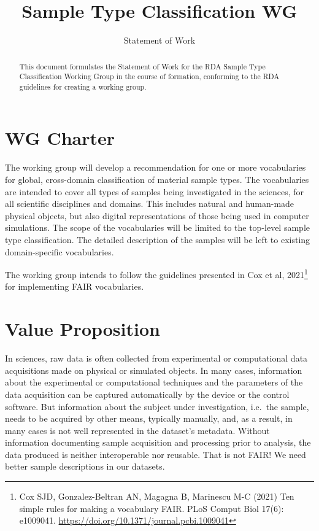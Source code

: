 \documentclass{scrartcl}
\begin{document}
\titlehead{\hfill\texttt{[image: rda-logo]}}
\title{Sample Type Classification WG}
\subtitle{Statement of Work}

\maketitle

\begin{abstract}\noindent
  This document formulates the Statement of Work for the RDA Sample
  Type Classification Working Group in the course of formation,
  conforming to the RDA guidelines for creating a working group.
\end{abstract}

\section{WG Charter}

The working group will develop a recommendation for one or more
vocabularies for global, cross-domain classification of material
sample types.  The vocabularies are intended to cover all types of
samples being investigated in the sciences, for all scientific
disciplines and domains.  This includes natural and human-made
physical objects, but also digital representations of those being used
in computer simulations.  The scope of the vocabularies will be
limited to the top-level sample type classification.  The detailed
description of the samples will be left to existing domain-specific
vocabularies.

The working group intends to follow the guidelines presented in Cox et
al, 2021\footnote{Cox SJD, Gonzalez-Beltran AN, Magagna B, Marinescu
  M-C (2021) Ten simple rules for making a vocabulary FAIR. PLoS
  Comput Biol 17(6): e1009041.
  \url{https://doi.org/10.1371/journal.pcbi.1009041}} for implementing
FAIR vocabularies.

\section{Value Proposition}

In sciences, raw data is often collected from experimental or
computational data acquisitions made on physical or simulated objects.
In many cases, information about the experimental or computational
techniques and the parameters of the data acquisition can be captured
automatically by the device or the control software.  But information
about the subject under investigation, i.e.\ the sample, needs to be
acquired by other means, typically manually, and, as a result, in many
cases is not well represented in the dataset’s metadata.  Without
information documenting sample acquisition and processing prior to
analysis, the data produced is neither interoperable nor reusable.
That is not FAIR!  We need better sample descriptions in our datasets.
\end{document}
